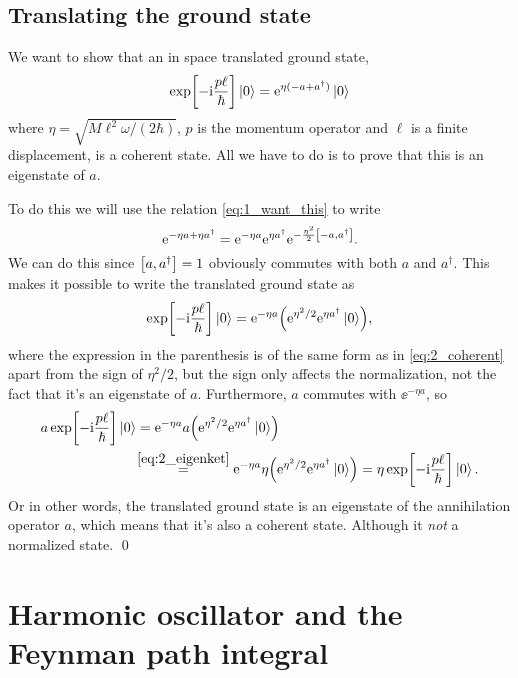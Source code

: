 \documentclass[11pt,letter, swedish, english
]{article}
\begin{document}
\subsection{Translating the ground state}
We want to show that an in space translated ground state,
\begin{equation}
\exp[-\mathrm{i}\frac{p\ell}{\hbar}]\ket{0}=\mathrm{e}^{\eta(-a+a^\dagger)}\ket{0}
\end{equation}
where $\eta=\sqrt{M\ell^2\omega/(2\hbar)}$, $p$ is the momentum
operator and $\ell$ is a finite displacement, is a coherent state. All
we have to do is to prove that this is an eigenstate of $a$.

To do this we will use the relation \eqref{eq:1_want_this} to write
\begin{equation}
\ee^{-\eta a + \eta a^\dagger}=\ee^{-\eta a}\ee^{\eta a^\dagger}
\ee^{-\frac{\eta^2}{2}\comm{-a}{a^\dagger}}.
\end{equation}
We can do this since $\comm{a}{a^\dagger}=1$ obviously commutes with
both $a$ and $a^\dagger$. This makes it possible to write the
translated ground state as
\begin{equation}
\exp[-\mathrm{i}\frac{p\ell}{\hbar}]\ket{0}
=\mathrm{e}^{-\eta a}\qty(\mathrm{e}^{\eta^2/2}\mathrm{e}^{\eta a^\dagger}\ket{0}),
\end{equation}
where the expression in the parenthesis is of the same form as in
\eqref{eq:2_coherent} apart from the sign of $\eta^2/2$, but the sign
only affects the normalization, not the fact that it's an eigenstate
of $a$. Furthermore, $a$ commutes with $\ee^{-\eta a}$, so 
\begin{equation}
\begin{aligned}
a\exp[-\mathrm{i}\frac{p\ell}{\hbar}]\ket{0}&=
\mathrm{e}^{-\eta a}a\qty(\mathrm{e}^{\eta^2/2}\mathrm{e}^{\eta a^\dagger}\ket{0})\\
&\hspace{-2pt}\stackrel{\eqref{eq:2_eigenket}}{=}
\mathrm{e}^{-\eta a}\eta\qty(\mathrm{e}^{\eta^2/2}\mathrm{e}^{\eta a^\dagger}\ket{0})
=\eta\exp[-\mathrm{i}\frac{p\ell}{\hbar}]\ket{0}.
\end{aligned}
\end{equation}
Or in other words, the translated ground state is an eigenstate of the
annihilation operator $a$, which means that it's also a coherent
state. Although it \emph{not} a normalized state.
\qed


\section{Harmonic oscillator and the Feynman path integral}
\end{document}
